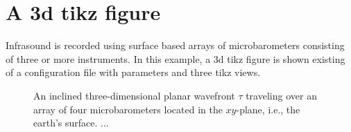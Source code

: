 \section{A 3d tikz figure}\label{sec:another:example1}

Infrasound is recorded using surface based arrays of microbarometers consisting of three or more instruments.
In this example, a 3d tikz figure is shown existing of a configuration file with parameters and three tikz views.

\begin{figure}[tbh]
\begin{center}
	
	
	\vspace{1em}
	
	
\caption[An inclined three-dimensional planar wavefront $\tau$ traveling over an array of four microbarometers.]{%
An inclined three-dimensional planar wavefront $\tau$ traveling over an array of four microbarometers located in the $xy$-plane, i.e., the earth's surface. ...
}
\label{fig:another:planewave}
\end{center}
\end{figure}